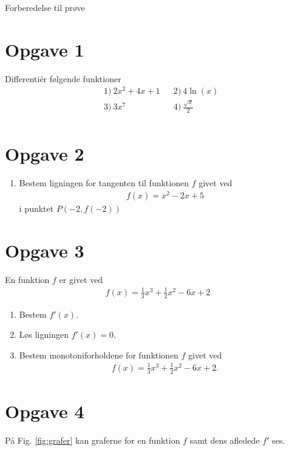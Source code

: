 
\begin{center}
\Huge
Forberedelse til prøve
\end{center}

\section*{Opgave 1}
Differentiér følgende funktioner
\begin{align*}
	&1) \ 2x^2+4x+1    &&2) \ 4\ln(x)    \\
	&3) \  3x^7   &&4) \ \frac{\sqrt{x}}{2}    \\
\end{align*}

\section*{Opgave 2}

\begin{enumerate}[label=\roman*)]
	\item Bestem ligningen for tangenten til funktionen $f$ givet ved
	\begin{align*}
		f(x) = x^2-2x+5
	\end{align*}
	i punktet $P(-2,f(-2))$
\end{enumerate}

\section*{Opgave 3}
En funktion $f$ er givet ved
\begin{align*}
	f(x) = \frac{1}{3}x^3+\frac{1}{2}x^2-6x+2
\end{align*}
\begin{enumerate}[label=\roman*)]
	\item Bestem $f'(x)$.
	\item Løs ligningen $f'(x) = 0$.
	\item Bestem monotoniforholdene for funktionen $f$ givet ved
	\begin{align*}
		f(x) = \frac{1}{3}x^3 + \frac{1}{2}x^2 -6x +2.
	\end{align*}
\end{enumerate}

\section*{Opgave 4}
På Fig. \ref{fig:grafer} kan graferne for en funktion $f$ samt dens afledede $f'$ ses.

